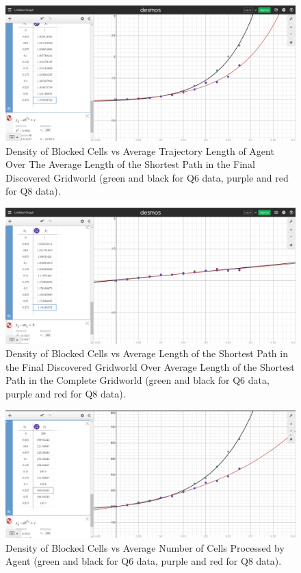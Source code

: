 \documentclass{homeworg}
\begin{document}
\begin{figure}[h]
  	\centering
  	\includegraphics*[scale=0.3]{Q8 Density vs Avg Trajectory Length Over Length in Final Discovered Gridworld.png}
	\caption{Density of Blocked Cells vs Average Trajectory Length of Agent Over The Average Length of the Shortest Path in the Final Discovered Gridworld (green and black for Q6 data, purple and red for Q8 data).}
	\label{fig:example}
\end{figure}

\begin{figure}[h]
  	\centering
  	\includegraphics*[scale=0.3]{Q8 Density vs Avg Length in Final Discovered Gridworld Over Length in Complete Gridworld.png}
	\caption{Density of Blocked Cells vs Average Length of the Shortest Path in the Final Discovered Gridworld Over Average Length of the Shortest Path in the Complete Gridworld (green and black for Q6 data, purple and red for Q8 data).}
	\label{fig:example}
\end{figure}

\begin{figure}[h]
  	\centering
  	\includegraphics*[scale=0.3]{Q8 Density vs Avg Number of Cells Processed.png}
	\caption{Density of Blocked Cells vs Average Number of Cells Processed by Agent (green and black for Q6 data, purple and red for Q8 data).}
	\label{fig:example}
\end{figure}
\end{document}
